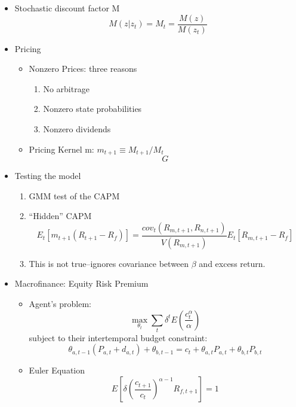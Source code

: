 \documentclass[11pt]{article}
\begin{document}
\begin{itemize}
    \item Stochastic discount factor M
    \[M(z|z_t) = M_t = \frac{M(z)}{M(z_t)}\]
    \item Pricing
        \begin{itemize}
            \item Nonzero Prices: three reasons
            \begin{enumerate}
                \item No arbitrage
                \item Nonzero state probabilities
                \item Nonzero dividends
            \end{enumerate}
            \item Pricing Kernel m: \(m_{t+1}\equiv M_{t+1} / M_t \)
            \[G\]
        \end{itemize}
    \item Testing the model
    \begin{enumerate}
        \item GMM test of the CAPM
        \item ``Hidden'' CAPM
        \[E_t[m_{t+1}(R_{t+1} - R_f)] = \frac{cov_t(R_{m,t+1}, R_{n, t+1})}{V(R_{m, t+1})} E_t[R_{m,t+1} - R_f]\]
        \item This is not true--ignores covariance between \(\beta\) and excess return. 
    \end{enumerate}
    \item Macrofinance: Equity Risk Premium
    \begin{itemize}
        \item Agent's problem:
        \[\max_{\theta_t} \sum_{t} \delta^t E \left(\frac{c_t^\alpha}{\alpha}\right)\]
        subject to their intertemporal budget constraint:
        \[\theta_{a, t-1} (P_{a, t} + d_{a,t}) + \theta_{b,t-1} = c_t + \theta_{a,t}P_{a,t} + \theta_{b,t}P_{b,t}\]
        \item Euler Equation
        \[E\left[ \delta\left( \frac{c_{t+1}}{c_t} \right)^{\alpha - 1}R_{f,t+1} \right] = 1\]
    \end{itemize}
\end{itemize}
\end{document}
